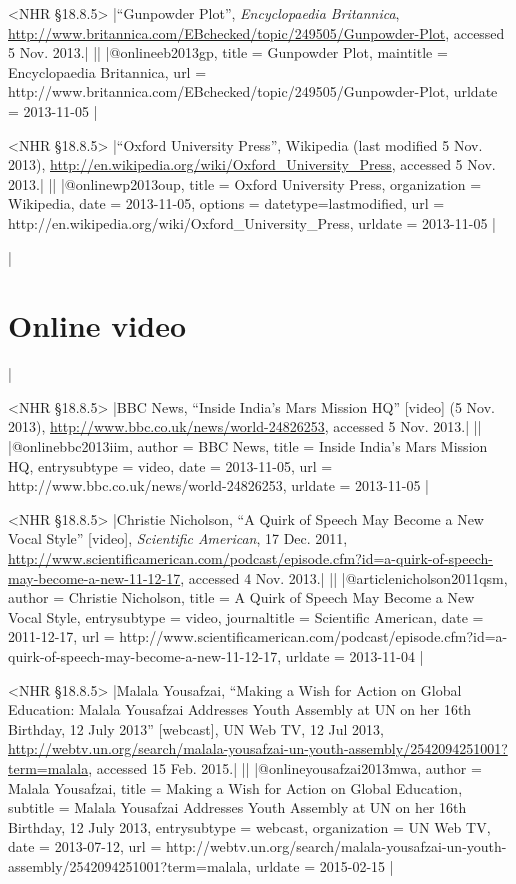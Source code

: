 \documentclass[extrafontsizes,11pt,a4paper,oneside]{memoir}
\begin{document}
\bibexample<NHR \S18.8.5>
|\enquote{Gunpowder Plot}, \emph{Encyclopaedia Britannica}, \url{http://www.britannica.com/EBchecked/topic/249505/Gunpowder-Plot}, accessed 5 Nov. 2013.|%
||%
|@online{eb2013gp,
  title = {Gunpowder Plot},
  maintitle = {Encyclopaedia Britannica},
  url = {http://www.britannica.com/EBchecked/topic/249505/Gunpowder-Plot},
  urldate = {2013-11-05}
}|

\bibexample<NHR \S18.8.5>
|\enquote{Oxford University Press}, Wikipedia (last modified 5 Nov. 2013), \url{http://en.wikipedia.org/wiki/Oxford_University_Press}, accessed 5 Nov. 2013.|%
||%
|@online{wp2013oup,
  title = {Oxford University Press},
  organization = {Wikipedia},
  date = {2013-11-05},
  options = {datetype=last{\space}modified},
  url = {http://en.wikipedia.org/wiki/Oxford_University_Press},
  urldate = {2013-11-05}
}|

\todoc|
\section{Online video}
|

\bibexample<NHR \S18.8.5>
|BBC News, \enquote{Inside India's Mars Mission HQ} [video] (5 Nov. 2013), \url{http://www.bbc.co.uk/news/world-24826253}, accessed 5 Nov. 2013.|%
||%
|@online{bbc2013iim,
  author = {{BBC News}},
  title = {Inside India's Mars Mission HQ},
  entrysubtype = {video},
  date = {2013-11-05},
  url = {http://www.bbc.co.uk/news/world-24826253},
  urldate = {2013-11-05}
}|

\bibexample<NHR \S18.8.5>
|Christie Nicholson, \enquote{A Quirk of Speech May Become a New Vocal Style} [video], \emph{Scientific American}, 17 Dec. 2011, \url{http://www.scientificamerican.com/podcast/episode.cfm?id=a-quirk-of-speech-may-become-a-new-11-12-17}, accessed 4 Nov. 2013.|%
||
|@article{nicholson2011qsm,
  author = {Christie Nicholson},
  title = {A Quirk of Speech May Become a New Vocal Style},
  entrysubtype = {video},
  journaltitle = {Scientific American},
  date = {2011-12-17},
  url = {http://www.scientificamerican.com/podcast/episode.cfm?id=a-quirk-of-speech-may-become-a-new-11-12-17},
  urldate = {2013-11-04}
}|

\bibexample<NHR \S18.8.5>
|Malala Yousafzai, \enquote{Making a Wish for Action on Global Education: Malala Yousafzai Addresses Youth Assembly at UN on her 16th Birthday, 12 July 2013} [webcast], UN Web TV, 12 Jul 2013, \url{http://webtv.un.org/search/malala-yousafzai-un-youth-assembly/2542094251001?term=malala}, accessed 15 Feb. 2015.|%
||%
|@online{yousafzai2013mwa,
  author = {Malala Yousafzai},
  title = {Making a Wish for Action on Global Education},
  subtitle = {Malala Yousafzai Addresses Youth Assembly at UN on her 16th Birthday, 12 July 2013},
  entrysubtype = {webcast},
  organization = {UN Web TV},
  date = {2013-07-12},
  url = {http://webtv.un.org/search/malala-yousafzai-un-youth-assembly/2542094251001?term=malala},
  urldate = {2015-02-15}
}|
\end{document}
